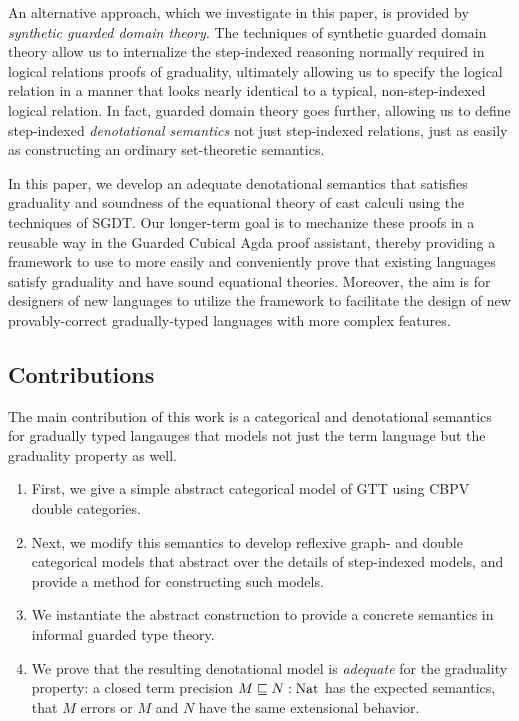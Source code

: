 An alternative approach, which we
investigate in this paper, is provided by \emph{synthetic guarded
domain theory}\cite{birkedal-mogelberg-schwinghammer-stovring2011}.
The techniques of synthetic guarded domain theory allow us to
internalize the step-indexed reasoning normally required in logical
relations proofs of graduality, ultimately allowing us to specify the
logical relation in a manner that looks nearly identical to a typical,
non-step-indexed logical relation. In fact, guarded domain theory goes
further, allowing us to define step-indexed \emph{denotational
semantics} not just step-indexed relations, just as easily as
constructing an ordinary set-theoretic semantics.

In this paper, we develop an adequate denotational semantics that
satisfies graduality and soundness of the equational theory of cast
calculi using the techniques of SGDT.  Our longer-term goal is to
mechanize these proofs in a reusable way in the Guarded Cubical Agda
proof assistant, thereby providing a framework to use to more easily
and conveniently prove that existing languages satisfy graduality and
have sound equational theories. Moreover, the aim is for designers of
new languages to utilize the framework to facilitate the design of new
provably-correct gradually-typed languages with more complex features.

\subsection{Contributions}

The main contribution of this work is a categorical and denotational
semantics for gradually typed langauges that models not just the term
language but the graduality property as well.
\begin{enumerate}
\item First, we give a simple abstract categorical model of GTT using CBPV double categories.
\item Next, we modify this semantics to develop reflexive graph- and
  double categorical models that abstract over the details of
  step-indexed models, and provide a method for constructing such models.
\item We instantiate the abstract construction to provide a concrete
  semantics in informal guarded type theory.
\item We prove that the resulting denotational model is
  \emph{adequate} for the graduality property: a closed term precision
  $M \sqsubseteq N : \text{Nat}$ has the expected semantics, that $M$ errors or
  $M$ and $N$ have the same extensional behavior.
\end{enumerate}

